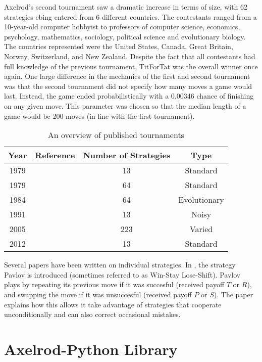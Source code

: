 Axelrod's second tournament \cite{Axelrod1980b} saw a dramatic increase in terms of size, with 62 strategies ebing entered from 6 different countries.
The contestants ranged from a 10-year-old computer hobbyist to professors of computer science, economics, psychology, mathematics, sociology, political science and evolutionary biology.
The countries represented were the United States, Canada, Great Britain, Norway, Switzerland, and New Zealand.
Despite the fact that all contestants had full knowledge of the previous tournament, TitForTat was the overall winner once again.
One large difference in the mechanics of the first and second tournament was that the second tournament did not specify how many moves a game would last.
Instead, the game ended probabilistically with a 0.00346 chance of finishing on any given move.
This parameter was chosen so that the median length of a game would be 200 moves (in line with the first tournament).

\begin{table}[htbp]
\centering
\begin{tabular}{c c c c}
\toprule
Year & Reference & Number of Strategies & Type\\
\midrule
1979 & \cite{Axelrod1980a} & 13 & Standard\\
1979 & \cite{Axelrod1980b} & 64 & Standard\\
1984 & \cite{Axelrod1981} & 64 & Evolutionary\\
1991 & \cite{Bendor1991} & 13 & Noisy\\
2005 & \cite{Chong2004} & 223 & Varied\\
2012 & \cite{Stewart2012} & 13 & Standard\\
\bottomrule
\end{tabular}
\label{tab:tournament_refs}
\caption{An overview of published tournaments}
\end{table}

Several papers have been written on individual strategies.
In \cite{Nowak1993}, the strategy Pavlov is introduced (sometimes referred to as Win-Stay Lose-Shift).
Pavlov plays by repeating its previous move if it was succesful (received payoff $T$ or $R$), and swapping the move if it was unsuccesful (received payoff $P$ or $S$).
The paper explains how this allows it take advantage of strategies that cooperate unconditionally and can also correct occasional mistakes.


\section{Axelrod-Python Library}

